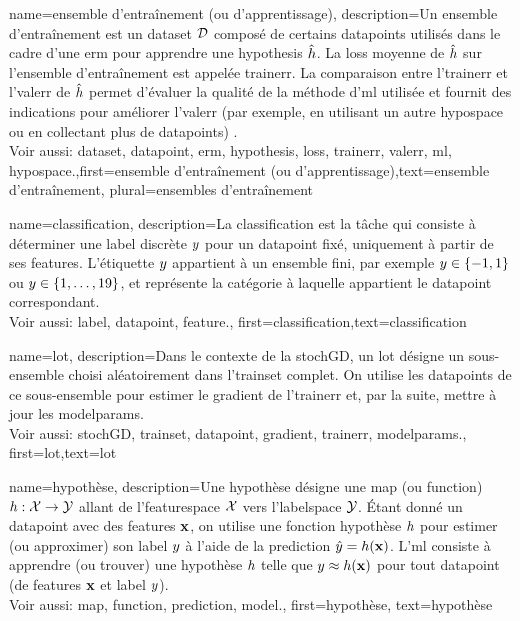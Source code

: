 {name={ensemble d'entraînement (ou d'apprentissage)},
	description={Un ensemble d'entraînement est un \gls{dataset} $\mathcal{D}$ composé de certains \glspl{datapoint} utilisés dans le cadre d'une \gls{erm} 
		pour apprendre une \gls{hypothesis} $\hat{h}$. La \gls{loss} moyenne de $\hat{h}$ sur 
		l'ensemble d'entraînement est appelée \gls{trainerr}. La comparaison entre l'\gls{trainerr} et l'\gls{valerr} de $\hat{h}$ permet d'évaluer la qualité de la méthode d'\gls{ml} utilisée et fournit des indications 
		pour améliorer l'\gls{valerr} (par exemple, en utilisant un autre \gls{hypospace} ou en collectant plus de \glspl{datapoint}) \cite[Sec. 6.6]{MLBasics}.
		\\
		Voir aussi: \gls{dataset}, \gls{datapoint}, \gls{erm}, \gls{hypothesis}, \gls{loss}, \gls{trainerr}, \gls{valerr}, \gls{ml}, \gls{hypospace}.},first={ensemble d'entraînement (ou d'apprentissage)},text={ensemble d'entraînement}, plural={ensembles d'entraînement}  
}

{name={classification},
	description={La classification est la tâche qui consiste à déterminer une \gls{label} discrète $y$ pour un \gls{datapoint} fixé, uniquement à partir de ses \glspl{feature}. L'étiquette $y$ appartient à un ensemble fini, par exemple $y \in \{-1,1\}$ ou $y \in \{1,\ldots,19\}$, et représente la catégorie à laquelle appartient le \gls{datapoint} correspondant.
		\\ 
		Voir aussi: \gls{label}, \gls{datapoint}, \gls{feature}.},
	first={classification},text={classification} 
}

{
	name={lot},
	description={Dans le contexte de la \gls{stochGD}, un lot désigne un sous-ensemble choisi aléatoirement dans l’\gls{trainset} complet. On utilise les \glspl{datapoint} de ce sous-ensemble pour estimer le \gls{gradient} de l’\gls{trainerr} et, par la suite, mettre à jour les \glspl{modelparam}.
		\\
		Voir aussi: \gls{stochGD}, \gls{trainset}, \gls{datapoint}, \gls{gradient}, \gls{trainerr}, \glspl{modelparam}.}, 
	first={lot},text={lot}  
}

{name={hypothèse},
	description={Une hypothèse désigne une \gls{map} (ou \gls{function}) $h: \mathcal{X} \rightarrow \mathcal{Y}$ allant de l'\gls{featurespace} $\mathcal{X}$ vers l'\gls{labelspace} $\mathcal{Y}$. 
		Étant donné un \gls{datapoint} avec des \glspl{feature} ${\bf x}$, on utilise une fonction hypothèse $h$
		pour estimer (ou approximer) son \gls{label} $y$ à l’aide de la \gls{prediction}  
		$\hat{y} = h({\bf x})$. L’\gls{ml} consiste à apprendre (ou trouver) une 
		hypothèse $h$ telle que $y \approx h({\bf x})$ 
		pour tout \gls{datapoint} (de \glspl{feature} ${\bf x}$ et \gls{label} $y$).
		\\ 
		Voir aussi: \gls{map}, \gls{function}, \gls{prediction}, \gls{model}.},
	first={hypothèse}, text={hypothèse}
}

